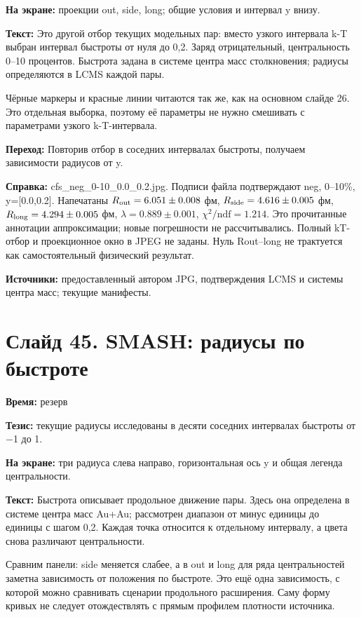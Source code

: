 \documentclass[11pt,a4paper]{article}
\begin{document}
\textbf{На экране:} проекции out, side, long; общие условия и интервал y внизу.

\textbf{Текст:} Это другой отбор текущих модельных пар: вместо узкого интервала k-T выбран интервал быстроты от нуля до 0,2. Заряд отрицательный, центральность 0–10 процентов. Быстрота задана в системе центра масс столкновения; радиусы определяются в LCMS каждой пары.

Чёрные маркеры и красные линии читаются так же, как на основном слайде 26. Это отдельная выборка, поэтому её параметры не нужно смешивать с параметрами узкого k-T-интервала.

\textbf{Переход:} Повторив отбор в соседних интервалах быстроты, получаем зависимости радиусов от y.

\textbf{Справка:} cfs\_neg\_0-10\_0.0\_0.2.jpg. Подписи файла подтверждают neg, 0–10\%, y=[0.0,0.2]. Напечатаны \(R_{\rm out}=6.051\pm0.008\) фм, \(R_{\rm side}=4.616\pm0.005\) фм, \(R_{\rm long}=4.294\pm0.005\) фм, \(\lambda=0.889\pm0.001\), \(\chi^2/\mathrm{ndf}=1.214\). Это прочитанные аннотации аппроксимации; новые погрешности не рассчитывались. Полный kT-отбор и проекционное окно в JPEG не заданы. Нуль Rout–long не трактуется как самостоятельный физический результат.

\textbf{Источники:} предоставленный автором JPG, подтверждения LCMS и системы центра масс; текущие манифесты.

\clearpage
\section*{Слайд 45. SMASH: радиусы по быстроте}
\textbf{Время:} резерв

\textbf{Тезис:} текущие радиусы исследованы в десяти соседних интервалах быстроты от −1 до 1.

\textbf{На экране:} три радиуса слева направо, горизонтальная ось y и общая легенда центральности.

\textbf{Текст:} Быстрота описывает продольное движение пары. Здесь она определена в системе центра масс Au+Au; рассмотрен диапазон от минус единицы до единицы с шагом 0,2. Каждая точка относится к отдельному интервалу, а цвета снова различают центральности.

Сравним панели: side меняется слабее, а в out и long для ряда центральностей заметна зависимость от положения по быстроте. Это ещё одна зависимость, с которой можно сравнивать сценарии продольного расширения. Саму форму кривых не следует отождествлять с прямым профилем плотности источника.
\end{document}
